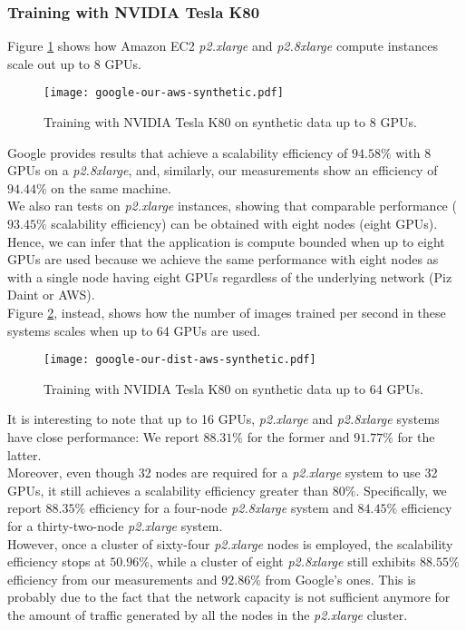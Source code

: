 \vspace{-0.3cm}
\subsubsection{Training with NVIDIA Tesla K80}
\vspace{-0.2cm}
Figure \ref{fig:aws-google-cscs} shows how Amazon EC2 \textit{p2.xlarge} and \textit{p2.8xlarge} compute instances scale out up to 8 GPUs.
\begin{figure}[H]
  \centering
  \texttt{[image: google-our-aws-synthetic.pdf]}
  \vspace{-0.85cm}
  \caption{Training with NVIDIA Tesla K80 on synthetic data up to 8 GPUs.} 
  \label{fig:aws-google-cscs}
\end{figure}
\vspace{-0.2cm}
Google provides results that achieve a scalability efficiency of $94.58\%$ with 8 GPUs on a \textit{p2.8xlarge}, and, similarly, our measurements show an efficiency of $94.44\%$ on the same machine.\\
We also ran tests on \textit{p2.xlarge} instances, showing that comparable performance ($93.45\%$ scalability efficiency) can be obtained with eight nodes (eight GPUs).\\
Hence, we can infer that the application is compute bounded when up to eight GPUs are used because we achieve the same performance with eight nodes as with a single node having eight GPUs regardless of the underlying network (Piz Daint or AWS).\\

Figure \ref{fig:dist-aws-google-cscs}, instead, shows how the number of images trained per second in these systems scales when up to 64 GPUs are used.
\begin{figure}[t]
  \centering
  \texttt{[image: google-our-dist-aws-synthetic.pdf]}
  \vspace{-0.85cm}
  \caption{Training with NVIDIA Tesla K80 on synthetic data up to 64 GPUs.} 
  \label{fig:dist-aws-google-cscs}
\end{figure}
It is interesting to note that up to 16 GPUs, \textit{p2.xlarge} and \textit{p2.8xlarge} systems have close performance: We report $88.31\%$ for the former and $91.77\%$ for the latter.\\
Moreover, even though 32 nodes are required for a \textit{p2.xlarge} system to use 32 GPUs, it still achieves a scalability efficiency greater than $80\%$.
Specifically, we report $88.35\%$ efficiency for a four-node \textit{p2.8xlarge} system and $84.45\%$ efficiency for a thirty-two-node \textit{p2.xlarge} system.\\
However, once a cluster of sixty-four \textit{p2.xlarge} nodes is employed, the scalability efficiency stops at $50.96\%$, while a cluster of eight \textit{p2.8xlarge} still exhibits $88.55\%$ efficiency from our measurements and $92.86\%$ from Google's ones.
This is probably due to the fact that the network capacity is not sufficient anymore for the amount of traffic generated by all the nodes in the \textit{p2.xlarge} cluster.

